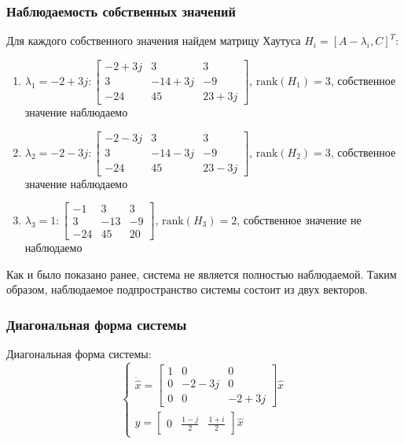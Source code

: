 \subsubsection{Наблюдаемость собственных значений}
Для каждого собственного значения найдем матрицу Хаутуса $H_i = [A - \lambda_i, C]^T$:
\begin{enumerate}
    \item $\lambda_1 = -2 + 3j: \begin{bmatrix}
        -2 + 3j & 3 & 3 \\
        3 & -14 + 3j & -9 \\
        -24 & 45 & 23 + 3j
        \end{bmatrix} $, $\text{rank}(H_1) = 3$, собственное значение наблюдаемо

    \item $\lambda_2 = -2 - 3j: \begin{bmatrix}
        -2 - 3j & 3 & 3 \\
        3 & -14 - 3j & -9 \\
        -24 & 45 & 23 - 3j
    \end{bmatrix}$, $\text{rank}(H_2) = 3$, собственное значение наблюдаемо

    \item $\lambda_3 = 1: \begin{bmatrix}
        -1 & 3 & 3 \\
        3 & -13 & -9 \\
        -24 & 45 & 20
    \end{bmatrix}$, $\text{rank}(H_3) = 2$, собственное значение не наблюдаемо
    
\end{enumerate}

Как и было показано ранее, система не является полностью наблюдаемой. Таким образом, наблюдаемое подпространство системы состоит из двух векторов.

\subsubsection{Диагональная форма системы}
Диагональная форма системы:
\begin{equation}
    \begin{cases}
        \dot{\hat{x}} = \begin{bmatrix}
            1 & 0 & 0 \\
            0 & -2-3j & 0 \\
            0 & 0 & -2+3j
        \end{bmatrix} \hat{x} \\ 
        y = \begin{bmatrix}
            0 & \frac{1-j}{2} & \frac{1 + i}{2}
        \end{bmatrix} \hat{x}
    \end{cases}
\end{equation}

